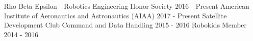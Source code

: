 \vspace{10pt}
\begin{cvhonors}
  \cvhonor
    {\hspace*{14pt}Rho Beta Epsilon - Robotics Engineering Honor Society}
    {}
    {}
    {2016 - Present}
  \cvhonor
    {\hspace*{14pt}American Institute of Aeronautics and Astronautics (AIAA)}
    {}
    {}
    {2017 - Present}
  \cvhonor
    {\hspace*{14pt}Satellite Development Club}
    {Command and Data Handling}
    {}
    {2015 - 2016}
  \cvhonor
    {\hspace*{14pt}Robokids}
    {Member}
    {}
    {2014 - 2016}
\end{cvhonors}